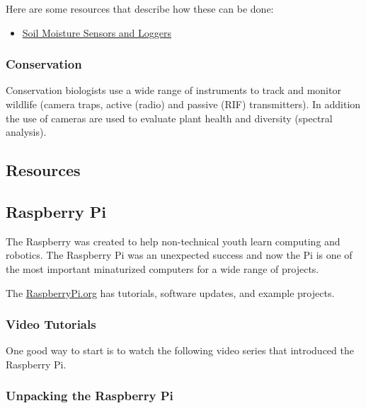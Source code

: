 \documentclass{article}\usepackage[]{graphicx}\usepackage[]{color}
\begin{document}
Here are some resources that describe how these can be done:

\begin{itemize}
\item \href{https://fyi.extension.wisc.edu/cropirrigation/files/2015/03/Methods.to_.Monitor.Soil_.Moisture.pdf}{Soil Moisture Sensors and Loggers}
\end{itemize}

\subsubsection{Conservation} 

Conservation biologists use a wide range of instruments to track and monitor wildlife (camera traps, active (radio) and passive (RIF) transmitters). In addition the use of cameras are used to evaluate plant health and diversity (spectral analysis). 

\subsection{Resources}

\subsection{Raspberry Pi}

The Raspberry was created to help non-technical youth learn computing and robotics. The Raspberry Pi was an unexpected success and now the Pi is one of the most important minaturized computers for a wide range of projects.  

The \href{https://www.raspberrypi.org/}{RaspberryPi.org} has tutorials, software updates, and example projects.

\subsubsection{Video Tutorials}

One good way to start is to watch the following video series that introduced the Raspberry Pi. 


\subsubsection{Unpacking the Raspberry Pi}
\end{document}
